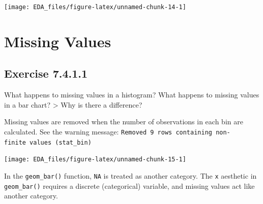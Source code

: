 \documentclass[]{book}
\newenvironment{Shaded}{\begin{snugshade}}{\end{snugshade}}
\newcommand{\CommentTok}[1]{\textcolor[rgb]{0.56,0.35,0.01}{\textit{#1}}}
\newcommand{\DataTypeTok}[1]{\textcolor[rgb]{0.13,0.29,0.53}{#1}}
\newcommand{\DecValTok}[1]{\textcolor[rgb]{0.00,0.00,0.81}{#1}}
\newcommand{\KeywordTok}[1]{\textcolor[rgb]{0.13,0.29,0.53}{\textbf{#1}}}
\newcommand{\NormalTok}[1]{#1}
\newcommand{\OperatorTok}[1]{\textcolor[rgb]{0.81,0.36,0.00}{\textbf{#1}}}
\newcommand{\OtherTok}[1]{\textcolor[rgb]{0.56,0.35,0.01}{#1}}
\newcommand{\StringTok}[1]{\textcolor[rgb]{0.31,0.60,0.02}{#1}}
\theoremstyle{plain}
\theoremstyle{remark}
\begin{document}
\begin{center}\texttt{[image: EDA\_files/figure-latex/unnamed-chunk-14-1]} \end{center}

\hypertarget{missing-values}{%
\section{Missing Values}\label{missing-values}}

\hypertarget{exercise-7.4.1.1}{%
\subsection*{\texorpdfstring{Exercise {7.4.1.1}}{Exercise 7.4.1.1}}\label{exercise-7.4.1.1}}

What happens to missing values in a histogram?
What happens to missing values in a bar chart? \textgreater{} Why is there a difference?

Missing values are removed when the number of observations in each bin are calculated. See the warning message: \texttt{Removed\ 9\ rows\ containing\ non-finite\ values\ (stat\_bin)}

\begin{Shaded}
\end{Shaded}

\begin{center}\texttt{[image: EDA\_files/figure-latex/unnamed-chunk-15-1]} \end{center}

In the \texttt{geom\_bar()} function, \texttt{NA} is treated as another category. The \texttt{x} aesthetic in \texttt{geom\_bar()} requires a discrete (categorical) variable, and missing values act like another category.
\end{document}
